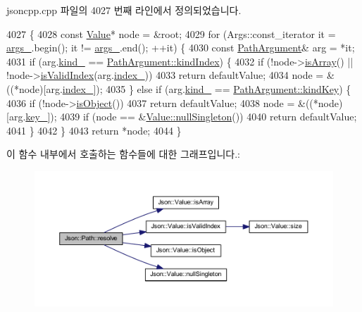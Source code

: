 jsoncpp.\+cpp 파일의 4027 번째 라인에서 정의되었습니다.


\begin{DoxyCode}
4027                                                                       \{
4028   \textcolor{keyword}{const} \hyperlink{class_json_1_1_value}{Value}* node = &root;
4029   \textcolor{keywordflow}{for} (Args::const\_iterator it = \hyperlink{class_json_1_1_path_af33d0de7ee9f99d3e361bdf504dc2bc7}{args\_}.begin(); it != \hyperlink{class_json_1_1_path_af33d0de7ee9f99d3e361bdf504dc2bc7}{args\_}.end(); ++it) \{
4030     \textcolor{keyword}{const} \hyperlink{class_json_1_1_path_argument}{PathArgument}& arg = *it;
4031     \textcolor{keywordflow}{if} (arg.\hyperlink{class_json_1_1_path_argument_ad4bc4b544b155a3d9c7788572ecf991b}{kind\_} == \hyperlink{class_json_1_1_path_argument_a2420bbad778573c147e578701b84d9b9ae5a976b898111903334cb131f5e03dc4}{PathArgument::kindIndex}) \{
4032       \textcolor{keywordflow}{if} (!node->\hyperlink{class_json_1_1_value_a1627eb9d6568d6d0252fa8bb711c0a59}{isArray}() || !node->\hyperlink{class_json_1_1_value_ac2928f174a6e081c1500c28c2d61ee93}{isValidIndex}(arg.\hyperlink{class_json_1_1_path_argument_afd5857d1b6bfaae6961333bdae7bd5ec}{index\_}))
4033         \textcolor{keywordflow}{return} defaultValue;
4034       node = &((*node)[arg.\hyperlink{class_json_1_1_path_argument_afd5857d1b6bfaae6961333bdae7bd5ec}{index\_}]);
4035     \} \textcolor{keywordflow}{else} \textcolor{keywordflow}{if} (arg.\hyperlink{class_json_1_1_path_argument_ad4bc4b544b155a3d9c7788572ecf991b}{kind\_} == \hyperlink{class_json_1_1_path_argument_a2420bbad778573c147e578701b84d9b9a74f5968d06c01701b7a46092c33ba7d1}{PathArgument::kindKey}) \{
4036       \textcolor{keywordflow}{if} (!node->\hyperlink{class_json_1_1_value_a8cf96c0f2a552051fcfc78ffee60e037}{isObject}())
4037         \textcolor{keywordflow}{return} defaultValue;
4038       node = &((*node)[arg.\hyperlink{class_json_1_1_path_argument_af4024368548ff730ef2bed97d6f1ca43}{key\_}]);
4039       \textcolor{keywordflow}{if} (node == &\hyperlink{class_json_1_1_value_af2f124567acc35d021a424e53ebdfcab}{Value::nullSingleton}())
4040         \textcolor{keywordflow}{return} defaultValue;
4041     \}
4042   \}
4043   \textcolor{keywordflow}{return} *node;
4044 \}
\end{DoxyCode}
이 함수 내부에서 호출하는 함수들에 대한 그래프입니다.\+:
\nopagebreak
\begin{figure}[H]
\begin{center}
\leavevmode
\includegraphics[width=350pt]{class_json_1_1_path_ab65ab001ccdbc6f8b5f123da58b92539_cgraph}
\end{center}
\end{figure}


